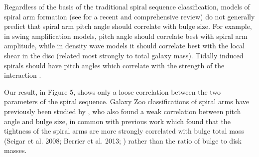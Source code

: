 \documentclass[usenatbib]{mn2e}
\begin{document}

 Regardless of the basis of the traditional spiral sequence classification, models of spiral arm formation (see \citealt{DobbsBaba2014} for a recent and comprehensive review) do not generally predict that spiral arm pitch angle should correlate with bulge size. For example, in swing amplification models, pitch angle should correlate best with spiral arm amplitude, while in density wave models it should correlate best with the local shear in the disc (related most strongly to total galaxy mass). Tidally induced spirals should have pitch angles which correlate with the strength of the interaction \citep{Kendall2011}. %
 
 Our result, in Figure 5, shows only a loose correlation between the two parameters of the spiral sequence. Galaxy Zoo classifications of spiral arms have previously been studied by \citet{Hart2017b}, who also found a weak correlation between pitch angle and bulge size, in common with previous work which found that the tightness of the spiral arms are more strongly correlated with bulge total mass (Seigar et al. 2008; Berrier et al. 2013; \citealt{Davis2015}) rather than the ratio of bulge to disk masses. %

% 


\end{document}
